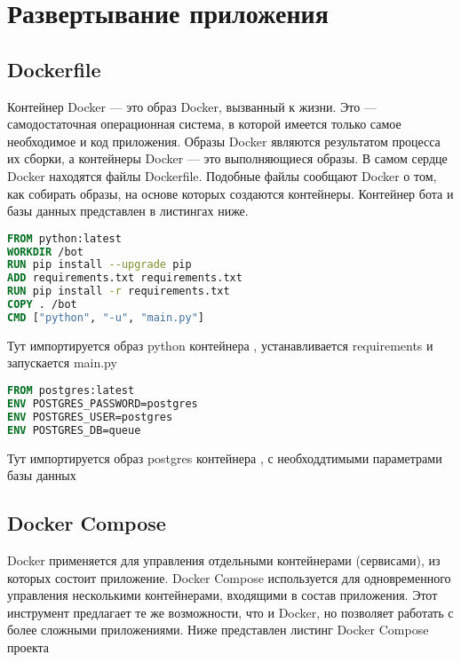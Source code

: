\graphicspath{{./img/}} %

\chapter{Развертывание приложения}
\section{Dockerfile}
Контейнер Docker — это образ Docker, вызванный к жизни.
Это — самодостаточная операционная система, в которой имеется только самое необходимое и код приложения.
Образы Docker являются результатом процесса их сборки, а контейнеры Docker — это выполняющиеся образы.
В самом сердце Docker находятся файлы Dockerfile.
Подобные файлы сообщают Docker о том, как собирать образы, на основе которых создаются контейнеры.
Контейнер бота и базы данных представлен в листингах ниже. \par

\begin{lstlisting}[language=Dockerfile
, caption=\leftline{Dockerfile бота}
, label=lst:DF:bot]
FROM python:latest
WORKDIR /bot
RUN pip install --upgrade pip
ADD requirements.txt requirements.txt
RUN pip install -r requirements.txt
COPY . /bot
CMD ["python", "-u", "main.py"]
\end{lstlisting}

Тут импортируется образ python контейнера , устанавливается requirements и запускается main.py \par

\begin{lstlisting}[language=Dockerfile
, caption=\leftline{Dockerfile базы данных}
, label=lst:DF:db]
FROM postgres:latest
ENV POSTGRES_PASSWORD=postgres
ENV POSTGRES_USER=postgres
ENV POSTGRES_DB=queue
\end{lstlisting}

Тут импортируется образ postgres контейнера , с необходдтимыми параметрами базы данных \par


\section{Docker Compose}
Docker применяется для управления отдельными контейнерами (сервисами), из которых состоит приложение.
Docker Compose используется для одновременного управления несколькими контейнерами, входящими в состав приложения.
Этот инструмент предлагает те же возможности, что и Docker, но позволяет работать с более сложными приложениями.
Ниже представлен листинг Docker Compose проекта \par


